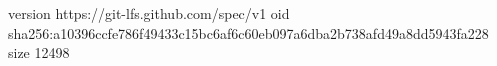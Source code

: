 version https://git-lfs.github.com/spec/v1
oid sha256:a10396ccfe786f49433c15bc6af6c60eb097a6dba2b738afd49a8dd5943fa228
size 12498
